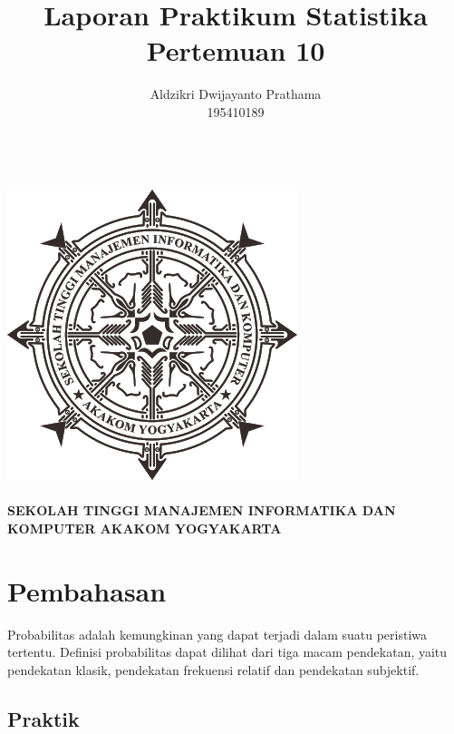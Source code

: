 \documentclass[a4paper,12pt]{article}
\begin{document}
\title{Laporan Praktikum Statistika Pertemuan 10}
\author{Aldzikri Dwijayanto Prathama 
	\\195410189}
\makeatletter
\begin{titlepage}
	\begin{center}
		{\huge \bfseries \@title }\\[14ex]
		\includegraphics[scale=.8]{logo}\\[4ex]
		{\large \@author}\\[20ex]
		{\large \bfseries {SEKOLAH TINGGI MANAJEMEN INFORMATIKA DAN KOMPUTER
				AKAKOM YOGYAKARTA}}
	\end{center}


\end{titlepage}
\makeatother
\newpage
\tableofcontents
\newpage
\section{Pembahasan}
Probabilitas adalah kemungkinan yang dapat terjadi dalam suatu peristiwa tertentu. Definisi probabilitas dapat dilihat dari tiga macam pendekatan, yaitu pendekatan klasik, pendekatan frekuensi relatif dan pendekatan subjektif.

\subsection{Praktik}
\end{document}

